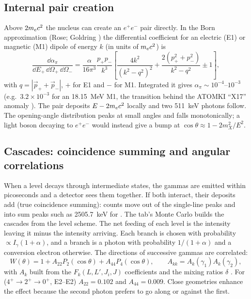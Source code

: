 \subsection{Internal pair creation}
Above $2m_e c^2$ the nucleus can create an $e^+e^-$ pair directly. In the Born approximation (Rose; Goldring \cite{goldring}) the differential coefficient for an electric (E1) or magnetic (M1) dipole of energy $k$ (in units of $m_e c^2$) is
\begin{equation}
\frac{\dd\alpha_\pi}{\dd E_+\,\dd\Omega_+\,\dd\Omega_-} = \frac{\alpha}{16\pi^3}\frac{p_+p_-}{k^3}\left[\frac{4k^2}{(k^2-q^2)^2} + \frac{2(p_+^2+p_-^2)}{k^2-q^2} \pm 1\right],
\end{equation}
with $q = |\vec p_+ + \vec p_-|$, $+$ for E1 and $-$ for M1. Integrated it gives $\alpha_\pi \sim 10^{-4}$--$10^{-3}$ (e.g.\ $3.2\times10^{-3}$ for an \SI{18.15}{MeV} M1, the  transition behind the ATOMKI ``X17'' anomaly \cite{atomki}). The pair deposits $E - 2m_e c^2$ locally and two \SI{511}{keV} photons follow. The opening-angle distribution peaks at small angles and falls monotonically; a light boson decaying to $e^+e^-$ would instead give a bump at $\cos\theta \approx 1 - 2m_X^2/E^2$.

\subsection{Cascades: coincidence summing and angular correlations}
When a level decays through intermediate states, the gammas are emitted within picoseconds and a detector sees them together. If both interact, their deposits add (true coincidence summing): counts move out of the single-line peaks and into sum peaks such as \SI{2505.7}{keV} for . The tab's Monte Carlo builds the cascades from the level scheme. The net feeding of each level is the intensity leaving it minus the intensity arriving. Each branch is chosen with probability $\propto I_\gamma(1+\alpha)$, and a branch is a photon with probability $1/(1+\alpha)$ and a conversion electron otherwise. The directions of successive gammas are correlated:
\begin{equation}
W(\theta) = 1 + A_{22}P_2(\cos\theta) + A_{44}P_4(\cos\theta),\qquad A_{kk} = A_k(\gamma_1)A_k(\gamma_2),
\end{equation}
with $A_k$ built from the $F_k(L,L',J_i,J)$ coefficients and the mixing ratios $\delta$ \cite{krane}. For  ($4^+\to2^+\to0^+$, E2--E2) $A_{22} = 0.102$ and $A_{44} = 0.009$. Close geometries enhance the effect because the second photon prefers to go along or against the first.

